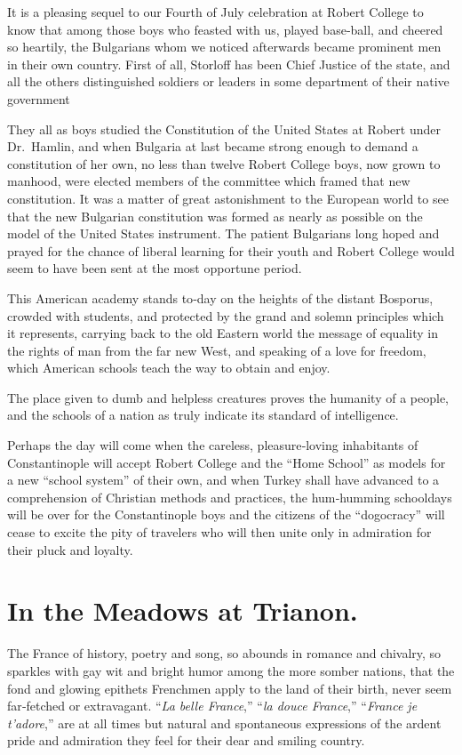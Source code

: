 \documentclass[12pt]{book}
\begin{document}
It is a pleasing sequel to our Fourth of July celebration at Robert College to
know that among those boys who feasted with us, played base‐ball, and cheered
so heartily, the Bulgarians whom we noticed afterwards became prominent men
in their own country. First of all, Storloff has been Chief Justice of the state, and
all the others distinguished soldiers or leaders in some department of their native
government

They all as boys studied the Constitution of the United States at Robert under
Dr.~Hamlin, and when Bulgaria at last became strong enough to demand a
constitution of her own, no less than twelve Robert College boys, now grown
to manhood, were elected members of the committee which framed that new
constitution. It was a matter of great astonishment to the European world to
see that the new Bulgarian constitution was formed as nearly as possible on the
model of the United States instrument. The patient Bulgarians long hoped and
prayed for the chance of liberal learning for their youth and Robert College would
seem to have been sent at the most opportune period.

This American academy stands to‐day on the heights of the distant Bosporus,
crowded with students, and protected by the grand and solemn principles which
it represents, carrying back to the old Eastern world the message of equality in
the rights of man from the far new West, and speaking of a love for freedom,
which American schools teach the way to obtain and enjoy.

The place given to dumb and helpless creatures proves the humanity of a
people, and the schools of a nation as truly indicate its standard of intelligence.

Perhaps the day will come when the careless, pleasure‐loving inhabitants of
Constantinople will accept Robert College and the “Home School” as models for
a new “school system” of their own, and when Turkey shall have advanced to a
comprehension of Christian methods and practices, the hum‐humming schooldays
will be over for the Constantinople boys and the citizens of the “dogocracy” will
cease to excite the pity of travelers who will then unite only in admiration for
their pluck and loyalty.

\chapter{In the Meadows at Trianon.}

The France of history, poetry and song, so abounds in romance and chivalry, so
sparkles with gay wit and bright humor among the more somber nations, that
the fond and glowing epithets Frenchmen apply to the land of their birth, never
seem far‐fetched or extravagant. “{\it La belle France},” “{\it la douce France},” “{\it France je
t’adore},” are at all times but natural and spontaneous expressions of the ardent
pride and admiration they feel for their dear and smiling country.
\end{document}
